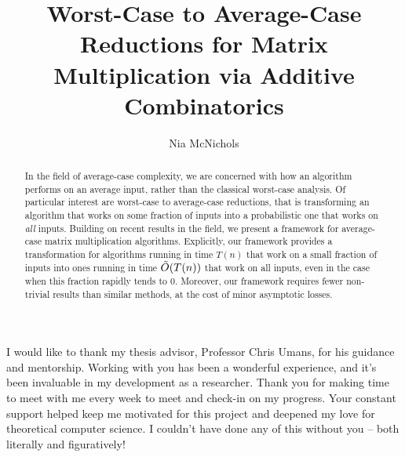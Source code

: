 \documentclass[12pt]{caltech_thesis}
\begin{document}
\title{Worst-Case to Average-Case Reductions for Matrix Multiplication via Additive Combinatorics}
\author{Nia McNichols}

\address{Pasadena, California}                     %



\maketitle[logo]
\begin{acknowledgements} 	 
   I would like to thank my thesis advisor, Professor Chris Umans, for his guidance and mentorship. Working with you has been a wonderful experience, and it's been invaluable in my development as a researcher. Thank you for making time to meet with me every week to meet and check-in on my progress. Your constant support helped keep me motivated for this project and deepened my love for theoretical computer science. I couldn't have done any of this without you -- both literally and figuratively!
\end{acknowledgements}

\begin{abstract}
   In the field of average-case complexity, we are concerned with how an algorithm performs on an average input, rather than the classical worst-case analysis. Of particular interest are worst-case to average-case reductions, that is transforming an algorithm that works on some fraction of inputs into a probabilistic one that works on \textit{all} inputs. Building on recent results in the field, we present a framework for average-case matrix multiplication algorithms. Explicitly, our framework provides a transformation for algorithms running in time $T(n)$ that work on a small fraction of inputs into ones running in time $\Tilde{O}(T(n))$ that work on all inputs, even in the case when this fraction rapidly tends to 0. Moreover, our framework requires fewer non-trivial results than similar methods, at the cost of minor asymptotic losses. 
\end{abstract}
\end{document}
